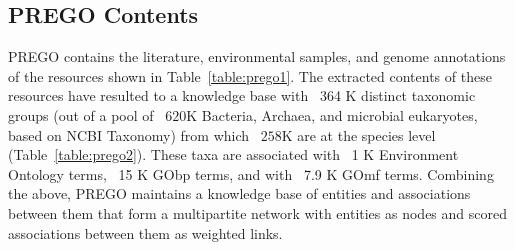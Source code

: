 {   \subsection{PREGO Contents}
   \label{subsec:prego-contents}

   PREGO contains the literature, environmental samples, and genome annotations of the resources shown in Table~\ref{table:prego1}. 
   The extracted contents of these resources have resulted to a knowledge base with ~364 K distinct taxonomic groups (out of a pool of ~$620$K Bacteria, Archaea, and microbial eukaryotes, based on NCBI Taxonomy) from which ~$258$K are at the species level (Table~\ref{table:prego2}). 
   These taxa are associated with ~1 K Environment Ontology terms, ~15 K GObp terms, and with ~7.9 K GOmf terms. 
   Combining the above, PREGO maintains a knowledge base of entities and associations between them that form a multipartite network with entities as nodes and scored associations between them as weighted links.


}
